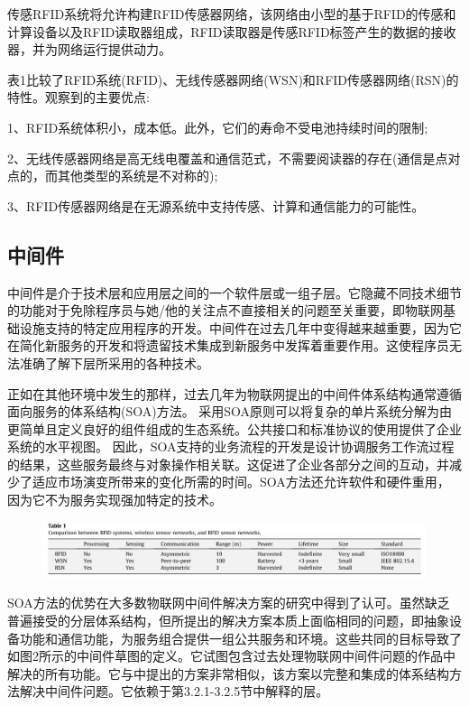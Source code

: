 \documentclass[12pt,a4paper]{article}%
\begin{document}
传感RFID系统将允许构建RFID传感器网络，该网络由小型的基于RFID的传感和计算设备以及RFID读取器组成，RFID读取器是传感RFID标签产生的数据的接收器，并为网络运行提供动力。

表1比较了RFID系统(RFID)、无线传感器网络(WSN)和RFID传感器网络(RSN)的特性。观察到的主要优点:

1、RFID系统体积小，成本低。此外，它们的寿命不受电池持续时间的限制;

2、无线传感器网络是高无线电覆盖和通信范式，不需要阅读器的存在(通信是点对点的，而其他类型的系统是不对称的);

3、RFID传感器网络是在无源系统中支持传感、计算和通信能力的可能性。

\subsection{中间件}
中间件是介于技术层和应用层之间的一个软件层或一组子层。它隐藏不同技术细节的功能对于免除程序员与她/他的关注点不直接相关的问题至关重要，即物联网基础设施支持的特定应用程序的开发。中间件在过去几年中变得越来越重要，因为它在简化新服务的开发和将遗留技术集成到新服务中发挥着重要作用。这使程序员无法准确了解下层所采用的各种技术。

正如在其他环境中发生的那样，过去几年为物联网提出的中间件体系结构通常遵循面向服务的体系结构(SOA)方法。
采用SOA原则可以将复杂的单片系统分解为由更简单且定义良好的组件组成的生态系统。公共接口和标准协议的使用提供了企业系统的水平视图。
因此，SOA支持的业务流程的开发是设计协调服务工作流过程的结果，这些服务最终与对象操作相关联。这促进了企业各部分之间的互动，并减少了适应市场演变所带来的变化所需的时间。SOA方法还允许软件和硬件重用，因为它不为服务实现强加特定的技术。

\begin{figure}[H]%
	\centering
	\begin{minipage}{0.83\textwidth}%
		\centering
		\includegraphics[width=1.0%
		\textwidth]{fig2.jpg}%
	\end{minipage}
\end{figure}

SOA方法的优势在大多数物联网中间件解决方案的研究中得到了认可。虽然缺乏普遍接受的分层体系结构，但所提出的解决方案本质上面临相同的问题，即抽象设备功能和通信功能，为服务组合提供一组公共服务和环境。这些共同的目标导致了如图2所示的中间件草图的定义。它试图包含过去处理物联网中间件问题的作品中解决的所有功能。它与中提出的方案非常相似，该方案以完整和集成的体系结构方法解决中间件问题。它依赖于第3.2.1-3.2.5节中解释的层。
\end{document}
